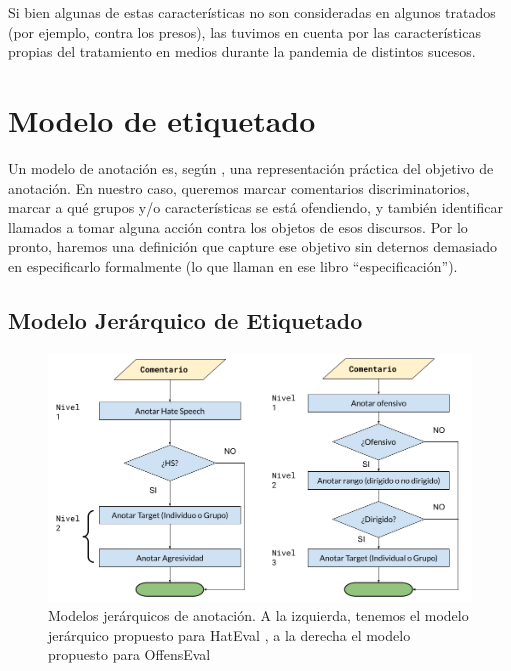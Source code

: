 Si bien algunas de estas características no son consideradas en algunos tratados (por ejemplo, contra los presos), las tuvimos en cuenta por las características propias del tratamiento en medios durante la pandemia de distintos sucesos.


\section{Modelo de etiquetado}



Un modelo de anotación es, según \citet{pustejovsky2012natural}, una representación práctica del objetivo de anotación. En nuestro caso, queremos marcar comentarios discriminatorios, marcar a qué grupos y/o características se está ofendiendo, y también identificar llamados a tomar alguna acción contra los objetos de esos discursos. Por lo pronto, haremos una definición que capture ese objetivo sin deternos demasiado en especificarlo formalmente (lo que llaman en ese libro ``especificación'').

\subsection{Modelo Jerárquico de Etiquetado}



\begin{figure}
    \centering
    \includegraphics[width=\textwidth]{img/modelosjerarquicos.png}
    \caption{Modelos jerárquicos de anotación. A la izquierda, tenemos el modelo jerárquico propuesto para HatEval \cite{hateval2019semeval}, a la derecha el modelo propuesto para OffensEval \cite{zampieri2019semeval2019}}
    \label{fig:modelos_offenseval_hateval}
\end{figure}

